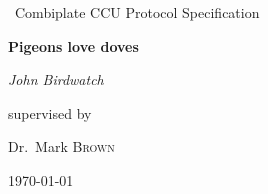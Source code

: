 \documentclass[]{scrartcl}
\begin{document}
\begin{titlepage}
	\raggedright
	
	\null\vspace{6cm}
	{\Huge\ Combiplate CCU Protocol Specification\par}
	\vspace{1cm}
	{\huge\bfseries Pigeons love doves\par}
	\vspace{2cm}
	{\Large\itshape John Birdwatch\par}
	\vfill
	supervised by\par
	Dr.~Mark \textsc{Brown}

	\vfill

	{\large \today\par}
\end{titlepage}
\end{document}
